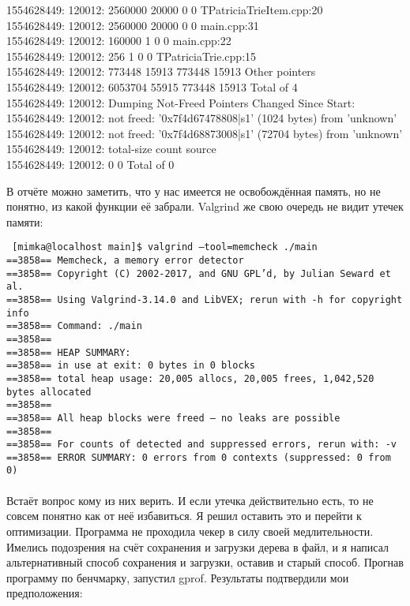 \documentclass[12pt]{article}
\begin{document}
{{		1554628449: 120012:     2560000  20000           0      0  TPatriciaTrieItem.cpp:20\\
		1554628449: 120012:     2560000  20000           0      0  main.cpp:31\\
		1554628449: 120012:      160000      1           0      0  main.cpp:22\\
		1554628449: 120012:         256      1           0      0  TPatriciaTrie.cpp:15\\
		1554628449: 120012:      773448  15913      773448  15913  Other pointers\\
		1554628449: 120012:     6053704  55915      773448  15913  Total of 4\\
		1554628449: 120012: Dumping Not-Freed Pointers Changed Since Start:\\
		1554628449: 120012:  not freed: '0x7f4d67478808|s1' (1024 bytes) from 'unknown'\\
		1554628449: 120012:  not freed: '0x7f4d68873008|s1' (72704 bytes) from 'unknown'\\
		1554628449: 120012:  total-size  count  source\\
		1554628449: 120012:           0      0  Total of 0\\
}}

В отчёте можно заметить, что у нас имеется не освобождённая память, но не понятно, из какой функции её забрали. Valgrind же свою очередь не видит утечек памяти: 

{\texttt{
		[mimka@localhost main]\$ valgrind --tool=memcheck ./main\\
		==3858== Memcheck, a memory error detector\\
		==3858== Copyright (C) 2002-2017, and GNU GPL'd, by Julian Seward et al.\\
		==3858== Using Valgrind-3.14.0 and LibVEX; rerun with -h for copyright info\\
		==3858== Command: ./main\\
		==3858== \\
		==3858== HEAP SUMMARY:\\
		==3858==     in use at exit: 0 bytes in 0 blocks\\
		==3858==   total heap usage: 20,005 allocs, 20,005 frees, 1,042,520 bytes allocated\\
		==3858== \\
		==3858== All heap blocks were freed -- no leaks are possible\\
		==3858== \\
		==3858== For counts of detected and suppressed errors, rerun with: -v\\
		==3858== ERROR SUMMARY: 0 errors from 0 contexts (suppressed: 0 from 0)\\
}}
\\
Встаёт вопрос кому из них верить. И если утечка действительно есть, то не совсем понятно как от неё избавиться. Я решил оставить это и перейти к оптимизации. Программа не проходила чекер в силу своей медлительности. Имелись подозрения на счёт сохранения и загрузки дерева в файл, и я написал альтернативный способ сохранения и загрузки, оставив и старый способ. Прогнав программу по бенчмарку, запустил gprof. Результаты подтвердили мои предположения:
\\
\end{document}
